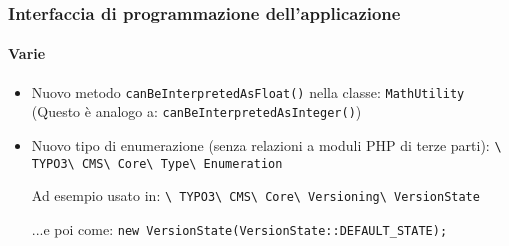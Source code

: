 \begin{frame}[fragile]
	\frametitle{Interfaccia di programmazione dell'applicazione}
	\framesubtitle{Varie}

	\begin{itemize}
		\item Nuovo metodo \texttt{canBeInterpretedAsFloat()} nella classe: \texttt{MathUtility}\newline
			\small(Questo è analogo a: \texttt{canBeInterpretedAsInteger()})\normalsize
		\item Nuovo tipo di enumerazione (senza relazioni a moduli PHP di terze parti):\newline
			\texttt{\textbackslash
				TYPO3\textbackslash
				CMS\textbackslash
				Core\textbackslash
				Type\textbackslash
				Enumeration}\newline

			Ad esempio usato in:\newline
			\texttt{\textbackslash
				TYPO3\textbackslash
				CMS\textbackslash
				Core\textbackslash
				Versioning\textbackslash
				VersionState}\newline

			...e poi come:\newline
			\texttt{new VersionState(VersionState::DEFAULT\_STATE);}

	\end{itemize}

\end{frame}


